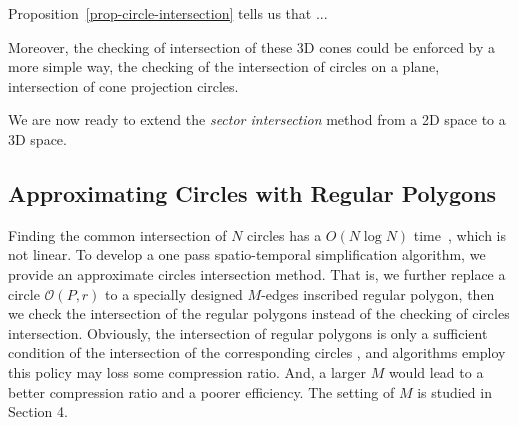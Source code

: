 

Proposition~\ref{prop-circle-intersection} tells us that ...


Moreover, the checking of intersection of these 3D cones could be enforced by a more simple way, \ie the checking of the intersection of circles on a plane, \ie intersection of cone projection circles.

We are now ready to extend the \emph{sector intersection} method \cite{Williams:Longest, Sklansky:Cone, Zhao:Sleeve} from a 2D space to a 3D space.


\subsection{Approximating Circles with Regular Polygons}
Finding the common intersection of $N$ circles has a ${O(N\log N)}$ time~\cite{Shamos:Circle}, which is not linear.
To develop a one pass spatio-temporal simplification algorithm, we provide an approximate circles intersection method.
That is, we further replace a circle $\mathcal{O}(P, r)$ to a specially designed $M$-edges inscribed regular polygon,
then we check the intersection of the regular polygons instead of the checking of circles intersection.
Obviously, the intersection of regular polygons is only a sufficient condition of the intersection of the corresponding circles , and
algorithms employ this policy may loss some compression ratio.
And, a larger $M$ would lead to a better compression ratio and a poorer efficiency.
\textcolor[rgb]{0.00,0.07,1.00}{The setting of $M$ is studied in Section 4.}

